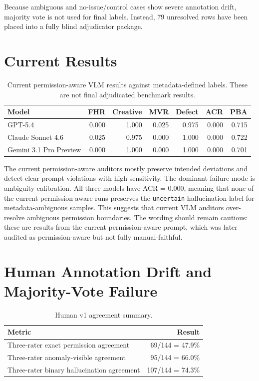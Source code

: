 \documentclass[11pt]{article}
\begin{document}
Because ambiguous and no-issue/control cases show severe annotation drift, majority vote is not used for final labels. Instead, 79 unresolved rows have been placed into a fully blind adjudicator package.

\section{Current Results}

\begin{table}[t]
\centering
\caption{Current permission-aware VLM results against metadata-defined labels. These are not final adjudicated benchmark results.}
\begin{tabular}{lrrrrrr}
\toprule
Model & FHR & Creative & MVR & Defect & ACR & PBA \\
\midrule
GPT-5.4 & 0.000 & 1.000 & 0.025 & 0.975 & 0.000 & 0.715 \\
Claude Sonnet 4.6 & 0.025 & 0.975 & 0.000 & 1.000 & 0.000 & 0.722 \\
Gemini 3.1 Pro Preview & 0.000 & 1.000 & 0.000 & 1.000 & 0.000 & 0.701 \\
\bottomrule
\end{tabular}
\end{table}

The current permission-aware auditors mostly preserve intended deviations and detect clear prompt violations with high sensitivity. The dominant failure mode is ambiguity calibration. All three models have ACR = 0.000, meaning that none of the current permission-aware runs preserves the \texttt{uncertain} hallucination label for metadata-ambiguous samples. This suggests that current VLM auditors over-resolve ambiguous permission boundaries. The wording should remain cautious: these are results from the current permission-aware prompt, which was later audited as permission-aware but not fully manual-faithful.

\section{Human Annotation Drift and Majority-Vote Failure}

\begin{table}[t]
\centering
\caption{Human v1 agreement summary.}
\begin{tabular}{lr}
\toprule
Metric & Result \\
\midrule
Three-rater exact permission agreement & 69/144 = 47.9\% \\
Three-rater anomaly-visible agreement & 95/144 = 66.0\% \\
Three-rater binary hallucination agreement & 107/144 = 74.3\% \\
\bottomrule
\end{tabular}
\end{table}
\end{document}

